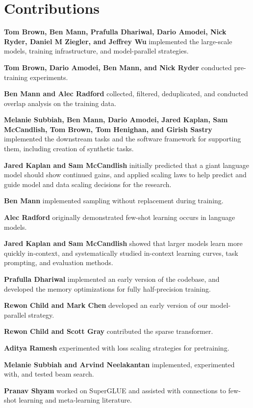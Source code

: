 \documentclass{article}
\begin{document}
\section*{Contributions}
\label{sec:contributions}
\textbf{Tom Brown, Ben Mann, Prafulla Dhariwal, Dario Amodei, Nick Ryder, Daniel M Ziegler, and Jeffrey Wu} implemented the large-scale models, training infrastructure, and model-parallel strategies.

\textbf{Tom Brown, Dario Amodei, Ben Mann, and Nick Ryder} conducted pre-training experiments.

\textbf{Ben Mann and Alec Radford} collected, filtered, deduplicated, and conducted overlap analysis on the training data.

\textbf{Melanie Subbiah, Ben Mann, Dario Amodei, Jared Kaplan, Sam McCandlish, Tom Brown, Tom Henighan, and Girish Sastry} implemented the downstream tasks and the software framework for supporting them, including creation of synthetic tasks.

\textbf{Jared Kaplan and Sam McCandlish} initially predicted that a giant language model should show continued gains, and applied scaling laws to help predict and guide model and data scaling decisions for the research.

\textbf{Ben Mann} implemented sampling without replacement during training.

\textbf{Alec Radford} originally demonstrated few-shot learning occurs in language models.

\textbf{Jared Kaplan and Sam McCandlish} showed that larger models learn more quickly in-context, and systematically studied in-context learning curves, task prompting, and evaluation methods.

\textbf{Prafulla Dhariwal} implemented an early version of the codebase, and developed the memory optimizations for fully half-precision training.

\textbf{Rewon Child and Mark Chen} developed an early version of our model-parallel strategy.

\textbf{Rewon Child and Scott Gray} contributed the sparse transformer.

\textbf{Aditya Ramesh} experimented with loss scaling strategies for pretraining.

\textbf{Melanie Subbiah and Arvind Neelakantan} implemented, experimented with, and tested beam search.

\textbf{Pranav Shyam} worked on SuperGLUE and assisted with connections to few-shot learning and meta-learning literature.
\end{document}
